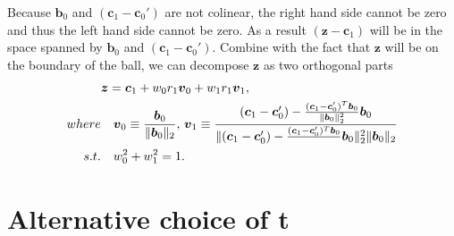 \begin{enumerate}
    Because $\boldsymbol b_0$ and $(\boldsymbol c_1-\boldsymbol c_0')$ are not colinear, the right hand side cannot be zero and thus the left hand side cannot be zero. As a result $(\boldsymbol z- \boldsymbol c_1)$ will be in the space spanned by $\boldsymbol b_0$ and $(\boldsymbol c_1-\boldsymbol c_0')$. Combine with the fact that $\boldsymbol z$ will be on the boundary of the ball, we can decompose $\boldsymbol z$ as two orthogonal parts 
    \begin{gather}
        \begin{aligned}
            &\boldsymbol z=\boldsymbol c_1+w_0 r_1\boldsymbol v_0+w_1 r_1\boldsymbol v_1,\\
            where&\quad \boldsymbol v_0\equiv\frac{\boldsymbol b_0}{\lVert\boldsymbol b_0\rVert_2},\, \boldsymbol v_1\equiv \frac{(\boldsymbol c_1-\boldsymbol c_0')-\frac{(\boldsymbol c_1-\boldsymbol c_0')^T\boldsymbol b_0}{\lVert\boldsymbol b_0\rVert_2^2}\boldsymbol b_0}{\lVert(\boldsymbol c_1-\boldsymbol c_0')-\frac{(\boldsymbol c_1-\boldsymbol c_0')^T\boldsymbol b_0}{}\boldsymbol b_0\lVert_2^2\rVert\boldsymbol b_0\rVert_2}\\
            s.t.&\quad w_0^2+w_1^2=1.
        \end{aligned}
    \end{gather}
\end{enumerate}

\section{Alternative choice of t}

